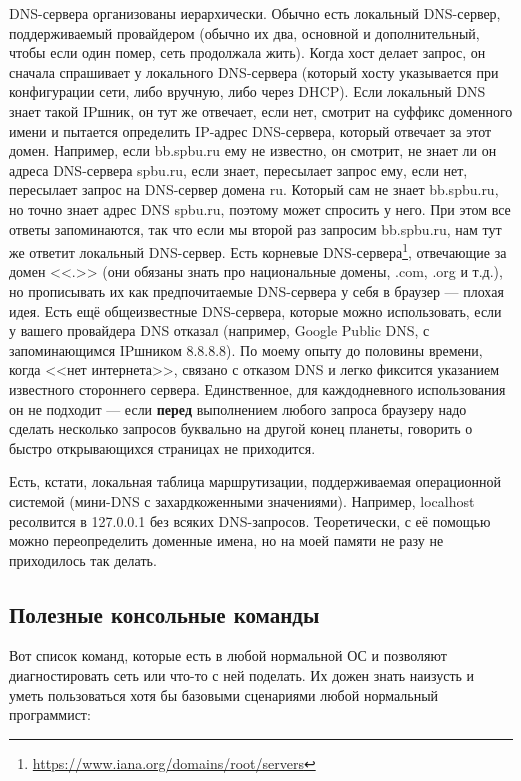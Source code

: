 \documentclass[a5paper]{article}
\begin{document}
DNS-сервера организованы иерархически. Обычно есть локальный DNS-сервер, поддерживаемый провайдером (обычно их два, основной и дополнительный, чтобы если один помер, сеть продолжала жить). Когда хост делает запрос, он сначала спрашивает у локального DNS-сервера (который хосту указывается при конфигурации сети, либо вручную, либо через DHCP). Если локальный DNS знает такой IPшник, он тут же отвечает, если нет, смотрит на суффикс доменного имени и пытается определить IP-адрес DNS-сервера, который отвечает за этот домен. Например, если bb.spbu.ru ему не известно, он смотрит, не знает ли он адреса DNS-сервера spbu.ru, если знает, пересылает запрос ему, если нет, пересылает запрос на DNS-сервер домена ru. Который сам не знает bb.spbu.ru, но точно знает адрес DNS spbu.ru, поэтому может спросить у него. При этом все ответы запоминаются, так что если мы второй раз запросим bb.spbu.ru, нам тут же ответит локальный DNS-сервер. Есть корневые DNS-сервера\footnote{\url{https://www.iana.org/domains/root/servers}}, отвечающие за домен <<.>> (они обязаны знать про национальные домены, .com, .org и т.д.), но прописывать их как предпочитаемые DNS-сервера у себя в браузер --- плохая идея. Есть ещё общеизвестные DNS-сервера, которые можно использовать, если у вашего провайдера DNS отказал (например, Google Public DNS, с запоминающимся IPшником 8.8.8.8). По моему опыту до половины времени, когда <<нет интернета>>, связано с отказом DNS и легко фиксится указанием известного стороннего сервера. Единственное, для каждодневного использования он не подходит --- если \textbf{перед} выполнением любого запроса браузеру надо сделать несколько запросов буквально на другой конец планеты, говорить о быстро открывающихся страницах не приходится.

Есть, кстати, локальная таблица маршрутизации, поддерживаемая операционной системой (мини-DNS с захардкоженными значениями). Например, localhost ресолвится в 127.0.0.1 без всяких DNS-запросов. Теоретически, с её помощью можно переопределить доменные имена, но на моей памяти не разу не приходилось так делать.

\subsection{Полезные консольные команды}

Вот список команд, которые есть в любой нормальной ОС и позволяют диагностировать сеть или что-то с ней поделать. Их дожен знать наизусть и уметь пользоваться хотя бы базовыми сценариями любой нормальный программист:
\end{document}
